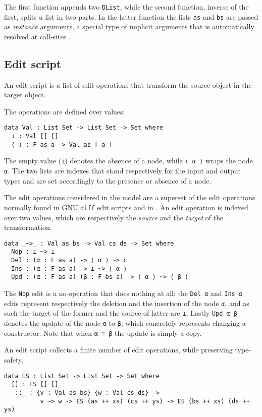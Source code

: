 \documentclass[../Thesis.tex]{subfiles}
\begin{document}
	The first function appends two \texttt{DList}, while the second function,
	inverse of the first, splits a list in two parts.
	In the latter function the lists \texttt{as} and \texttt{bs} are passed
	as \emph{instance} arguments, a special type of implicit arguments 
	that is automatically resolved at call-sites \cite{Devriese11}.
		 
	\subsection{Edit script}
	\label{subsec:EditScript}
	An edit script is a list of edit operations that transform the source object in
	the target object.

	The operations are defined over values:
		
\begin{verbatim}
data Val : List Set -> List Set -> Set where
  ⊥ : Val [] []
  ⟨_⟩ : F as a -> Val as [ a ] 
\end{verbatim}
	The empty value (\texttt{⊥}) denotes the absence of a node,
	while \texttt{⟨ α ⟩} wraps the node \texttt{α}.
	The two lists are indexes that stand respectively for the input and 
	output types and are set accordingly to the presence or absence 
	of a node.
	
	The edit operations considered in the model are a superset of the edit
	operations normally found in GNU \texttt{diff} edit scripts and in 
	\cite{Lemp09}.
	An edit operation is indexed over two values, which are respectively
	the \emph{source} and the \emph{target} of the transformation.
	
\begin{verbatim}
data _~>_ : Val as bs -> Val cs ds -> Set where
  Nop : ⊥ ~> ⊥
  Del : (α : F as a) -> ⟨ α ⟩ ~> c
  Ins : (α : F as a) -> ⊥ ~> ⟨ α ⟩
  Upd : (α : F as a) (β : F bs a) -> ⟨ α ⟩ ~> ⟨ β ⟩
\end{verbatim}
	
	The \texttt{Nop} edit is a no-operation that does nothing
	at all; the \texttt{Del α} and \texttt{Ins α} edits represent 
	respectively the deletion and the insertion of the node \texttt{α}, and as 
	such the target of the former and the source of latter are \texttt{⊥}.
	Lastly \texttt{Upd α β} denotes the update of the node \texttt{α}
	to \texttt{β}, which concretely represents changing a constructor. 
	Note that when \texttt{α ≅ β} the update is simply a copy.

	An edit script collects a finite number of edit operations, 
	while preserving type-safety.
\begin{verbatim}
data ES : List Set -> List Set -> Set where
  [] : ES [] []
  _::_ : {v : Val as bs} {w : Val cs ds} -> 
          v ~> w -> ES (as ++ xs) (cs ++ ys) -> ES (bs ++ xs) (ds ++ ys)
\end{verbatim}
\end{document}
